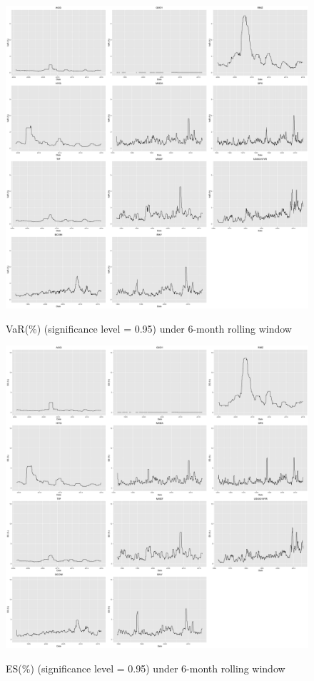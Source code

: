 \begin{figure}[h]
\caption{VaR(\%) (significance level = 0.95) under 6-month rolling window}
\centering 
\includegraphics[width=15cm]{../results/VaR6mon_scaled}
\label{fig: VaR6mon}
\end{figure}

\begin{figure}[h]
\caption{ES(\%) (significance level = 0.95) under 6-month rolling window} 
\centering 
\includegraphics[width=15cm]{../results/ES6mon_scaled}
\label{fig: ES6mon}
\end{figure}

